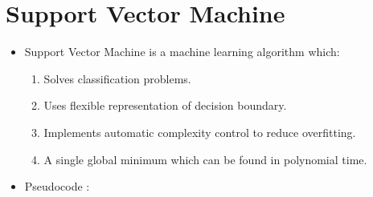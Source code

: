 \documentclass[a4paper,10pt]{article}
\begin{document}
\section{Support Vector Machine}

\begin{itemize}
	\item Support Vector Machine is a machine learning algorithm which:
	\begin{enumerate}
		\item Solves classification problems.
		\item Uses flexible representation of decision boundary.
		\item Implements automatic complexity control to reduce overfitting.
		\item A single global minimum which can be found in polynomial
		time.
	\end{enumerate}
    \item  Pseudocode :
    

\end{itemize}
\end{document}
